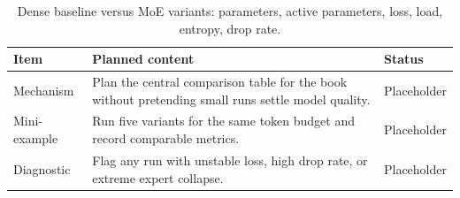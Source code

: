 \begin{table}[H]
\centering
\caption{Dense baseline versus MoE variants: parameters, active parameters, loss, load, entropy, drop rate.}
\label{tab:ch11-ablation-matrix-dense-top-1-top-2-shared-and-bias-balanced}
\begin{tabularx}{\textwidth}{p{}X p{}}
\toprule
Item & Planned content & Status \\
\midrule
Mechanism & Plan the central comparison table for the book without pretending small runs settle model quality. & Placeholder \\
Mini-example & Run five variants for the same token budget and record comparable metrics. & Placeholder \\
Diagnostic & Flag any run with unstable loss, high drop rate, or extreme expert collapse. & Placeholder \\
\bottomrule
\end{tabularx}
\end{table}
